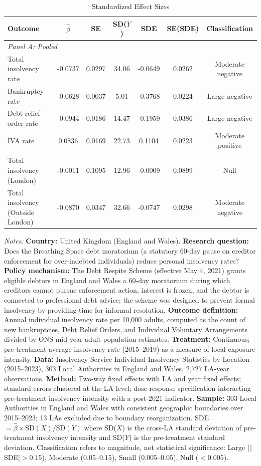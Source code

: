 \begin{table}[htbp]
\centering
\caption{Standardized Effect Sizes}
\label{tab:sde}
\small
\begin{tabular}{lcccccc}
\hline\hline
Outcome & $\hat{\beta}$ & SE & SD($Y$) & SDE & SE(SDE) & Classification \\
\hline
\multicolumn{7}{l}{\textit{Panel A: Pooled}} \\
Total insolvency rate & -0.0737 & 0.0297 & 34.06 & -0.0649 & 0.0262 & Moderate negative \\
Bankruptcy rate & -0.0628 & 0.0037 & 5.01 & -0.3768 & 0.0224 & Large negative \\
Debt relief order rate & -0.0944 & 0.0186 & 14.47 & -0.1959 & 0.0386 & Large negative \\
IVA rate & 0.0836 & 0.0169 & 22.73 & 0.1104 & 0.0223 & Moderate positive \\
\addlinespace
\multicolumn{7}{l}{\textit{Panel B: Heterogeneous}} \\
Total insolvency (London) & -0.0011 & 0.1095 & 12.96 & -0.0009 & 0.0899 & Null \\
Total insolvency (Outside London) & -0.0870 & 0.0347 & 32.66 & -0.0747 & 0.0298 & Moderate negative \\
\hline\hline
\end{tabular}
\begin{tablenotes}
\item \textit{Notes:} \textbf{Country:} United Kingdom (England and Wales). \textbf{Research question:} Does the Breathing Space debt moratorium (a statutory 60-day pause on creditor enforcement for over-indebted individuals) reduce personal insolvency rates? \textbf{Policy mechanism:} The Debt Respite Scheme (effective May 4, 2021) grants eligible debtors in England and Wales a 60-day moratorium during which creditors cannot pursue enforcement action, interest is frozen, and the debtor is connected to professional debt advice; the scheme was designed to prevent formal insolvency by providing time for informal resolution. \textbf{Outcome definition:} Annual individual insolvency rate per 10,000 adults, computed as the count of new bankruptcies, Debt Relief Orders, and Individual Voluntary Arrangements divided by ONS mid-year adult population estimates. \textbf{Treatment:} Continuous; pre-treatment average insolvency rate (2015--2019) as a measure of local exposure intensity. \textbf{Data:} Insolvency Service Individual Insolvency Statistics by Location (2015--2023), 303 Local Authorities in England and Wales, 2,727 LA-year observations. \textbf{Method:} Two-way fixed effects with LA and year fixed effects; standard errors clustered at the LA level; dose-response specification interacting pre-treatment insolvency intensity with a post-2021 indicator. \textbf{Sample:} 303 Local Authorities in England and Wales with consistent geographic boundaries over 2015--2023; 13 LAs excluded due to boundary reorganization. SDE $= \hat{\beta} \times \text{SD}(X) / \text{SD}(Y)$ where SD($X$) is the cross-LA standard deviation of pre-treatment insolvency intensity and SD($Y$) is the pre-treatment standard deviation. Classification refers to magnitude, not statistical significance: Large ($|$SDE$| > 0.15$), Moderate ($0.05$--$0.15$), Small ($0.005$--$0.05$), Null ($< 0.005$).

\end{tablenotes}
\end{table}
